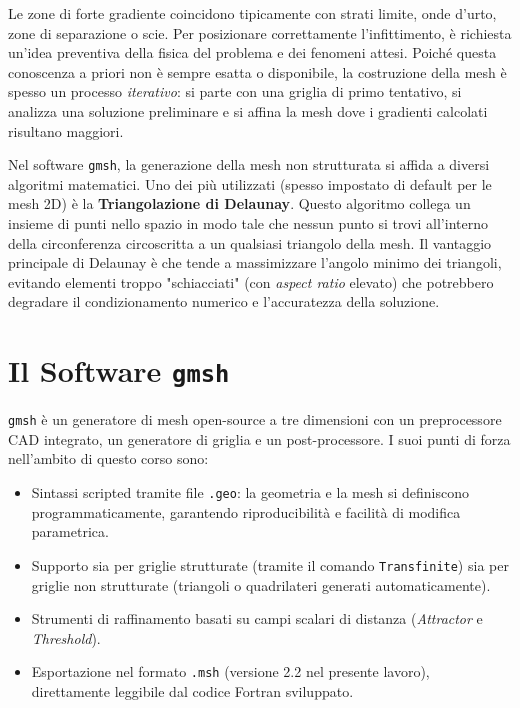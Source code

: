 Le zone di forte gradiente coincidono tipicamente con strati limite, onde d'urto, zone di separazione o scie. Per posizionare correttamente l'infittimento, è richiesta un'idea preventiva della fisica del problema e dei fenomeni attesi. Poiché questa conoscenza a priori non è sempre esatta o disponibile, la costruzione della mesh è spesso un processo \emph{iterativo}: si parte con una griglia di primo tentativo, si analizza una soluzione preliminare e si affina la mesh dove i gradienti calcolati risultano maggiori.

Nel software \texttt{gmsh}, la generazione della mesh non strutturata si affida a diversi algoritmi matematici. Uno dei più utilizzati (spesso impostato di default per le mesh 2D) è la \textbf{Triangolazione di Delaunay}. Questo algoritmo collega un insieme di punti nello spazio in modo tale che nessun punto si trovi all'interno della circonferenza circoscritta a un qualsiasi triangolo della mesh. Il vantaggio principale di Delaunay è che tende a massimizzare l'angolo minimo dei triangoli, evitando elementi troppo "schiacciati" (con \textit{aspect ratio} elevato) che potrebbero degradare il condizionamento numerico e l'accuratezza della soluzione.

\section{Il Software \texttt{gmsh}}

\texttt{gmsh} è un generatore di mesh open-source a tre dimensioni con un preprocessore CAD
integrato, un generatore di griglia e un post-processore. I suoi punti di forza nell'ambito di
questo corso sono:
\begin{itemize}
  \item Sintassi scripted tramite file \texttt{.geo}: la geometria e la mesh si definiscono
    programmaticamente, garantendo riproducibilità e facilità di modifica parametrica.
  \item Supporto sia per griglie strutturate (tramite il comando \texttt{Transfinite}) sia per
    griglie non strutturate (triangoli o quadrilateri generati automaticamente).
  \item Strumenti di raffinamento basati su campi scalari di distanza (\textit{Attractor} e
    \textit{Threshold}).
  \item Esportazione nel formato \texttt{.msh} (versione 2.2 nel presente lavoro), direttamente
    leggibile dal codice Fortran sviluppato.
\end{itemize}

